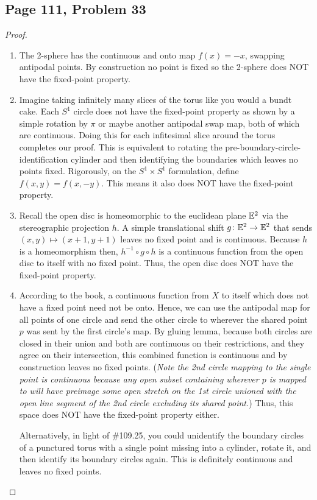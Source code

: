 \subsection*{Page 111, Problem 33}
\vspace{15pt}
\begin{proof}
    \vspace{-10pt}
    \begin{enumerate}[label = (\alph*)] \;
        \item The 2-sphere has the continuous and onto map $f(x) = -x$, swapping antipodal points. By construction no point is fixed so the 2-sphere does NOT have the fixed-point property.
        \item Imagine taking infinitely many slices of the torus like you would a bundt cake. Each $S^1$ circle does not have the fixed-point property as shown by a simple rotation by $\pi$ or maybe another antipodal swap map, both of which are continuous. Doing this for each infitesimal slice around the torus completes our proof. This is equivalent to rotating the pre-boundary-circle-identification cylinder and then identifying the boundaries which leaves no points fixed. Rigorously, on the $S^1\times S^1$ formulation, define $f(x,y) = f(x,-y)$. This means it also does NOT have the fixed-point property.
        
        \item  Recall the open disc is homeomorphic to the euclidean plane $\mathbb{E}^2$ via the stereographic projection $h$. A simple translational shift $g\colon\mathbb{E}^2\to\mathbb{E}^2$ that sends $(x,y) \mapsto (x+1, y+1)$ leaves no fixed point and is continuous. Because $h$ is a homeomorphism then, $h^{-1}\circ g\circ h$ is a continuous function from the open disc to itself with no fixed point. Thus, the open disc does NOT have the fixed-point property.
        
        \item According to the book, a continuous function from $X$ to itself which does not have a fixed point need not be onto. Hence, we can use the antipodal map for all points of one circle and send the other circle to wherever the shared point $p$ was sent by the first circle's map. By gluing lemma, because both circles are closed in their union and both are continuous on their restrictions, and they agree on their intersection, this combined function is continuous and by construction leaves no fixed points. (\emph{Note the 2nd circle mapping to the single point is continuous because any open subset containing wherever $p$ is mapped to will have preimage some open stretch on the 1st circle unioned with the open line segment of the 2nd circle excluding its shared point.}) Thus, this space does NOT have the fixed-point property either.
        
        Alternatively, in light of \#109.25, you could unidentify the boundary circles of a punctured torus with a single point missing into a cylinder, rotate it, and then identify its boundary circles again. This is definitely continuous and leaves no fixed points.
    \end{enumerate}
\end{proof}